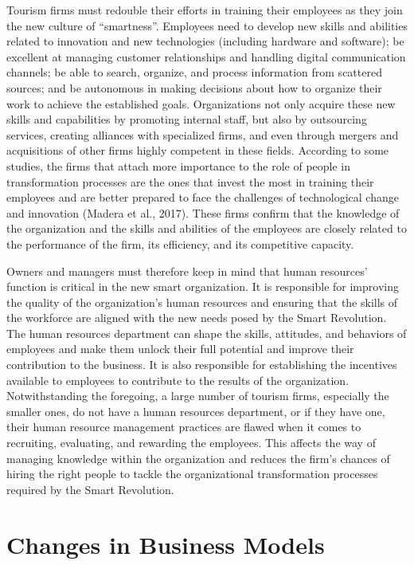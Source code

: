 \documentclass[
  letterpaper,
  DIV=11,
  numbers=noendperiod]{scrreprt}
\begin{document}
Tourism firms must redouble their efforts in training their employees as
they join the new culture of ``smartness''. Employees need to develop
new skills and abilities related to innovation and new technologies
(including hardware and software); be excellent at managing customer
relationships and handling digital communication channels; be able to
search, organize, and process information from scattered sources; and be
autonomous in making decisions about how to organize their work to
achieve the established goals. Organizations not only acquire these new
skills and capabilities by promoting internal staff, but also by
outsourcing services, creating alliances with specialized firms, and
even through mergers and acquisitions of other firms highly competent in
these fields. According to some studies, the firms that attach more
importance to the role of people in transformation processes are the
ones that invest the most in training their employees and are better
prepared to face the challenges of technological change and innovation
(Madera et al., 2017). These firms confirm that the knowledge of the
organization and the skills and abilities of the employees are closely
related to the performance of the firm, its efficiency, and its
competitive capacity.

Owners and managers must therefore keep in mind that human resources'
function is critical in the new smart organization. It is responsible
for improving the quality of the organization's human resources and
ensuring that the skills of the workforce are aligned with the new needs
posed by the Smart Revolution. The human resources department can shape
the skills, attitudes, and behaviors of employees and make them unlock
their full potential and improve their contribution to the business. It
is also responsible for establishing the incentives available to
employees to contribute to the results of the organization.
Notwithstanding the foregoing, a large number of tourism firms,
especially the smaller ones, do not have a human resources department,
or if they have one, their human resource management practices are
flawed when it comes to recruiting, evaluating, and rewarding the
employees. This affects the way of managing knowledge within the
organization and reduces the firm's chances of hiring the right people
to tackle the organizational transformation processes required by the
Smart Revolution.

\hypertarget{changes-in-business-models}{%
\section{Changes in Business Models}\label{changes-in-business-models}}
\end{document}
